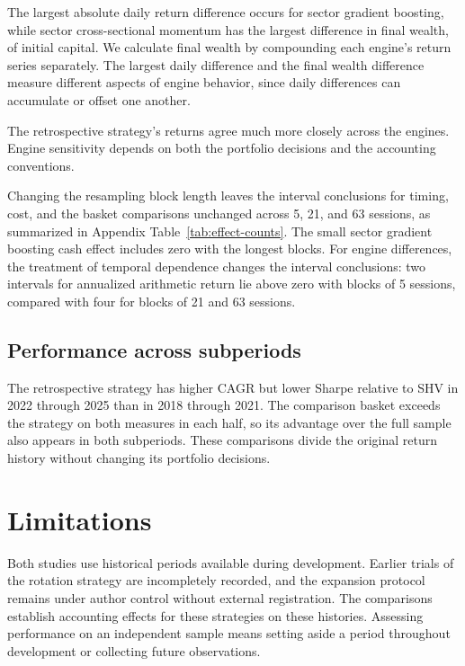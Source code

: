 \documentclass{article}
\begin{document}
The largest absolute daily return difference occurs for sector gradient boosting, while sector cross-sectional momentum has the largest difference in final wealth, \ExpansionEngineMaxWealthGap{} of initial capital. We calculate final wealth by compounding each engine's return series separately. The largest daily difference and the final wealth difference measure different aspects of engine behavior, since daily differences can accumulate or offset one another.

The retrospective strategy's returns agree much more closely across the engines. Engine sensitivity depends on both the portfolio decisions and the accounting conventions.

Changing the resampling block length leaves the interval conclusions for timing, cost, and the basket comparisons unchanged across 5, 21, and 63 sessions, as summarized in Appendix Table~\ref{tab:effect-counts}. The small sector gradient boosting cash effect includes zero with the longest blocks. For engine differences, the treatment of temporal dependence changes the interval conclusions: two intervals for annualized arithmetic return lie above zero with blocks of 5 sessions, compared with four for blocks of 21 and 63 sessions.

\subsection{Performance across subperiods}

The retrospective strategy has higher CAGR but lower Sharpe relative to SHV in 2022 through 2025 than in 2018 through 2021. The comparison basket exceeds the strategy on both measures in each half, so its advantage over the full sample also appears in both subperiods. These comparisons divide the original return history without changing its portfolio decisions.

\section{Limitations}
\label{sec:limitations}

Both studies use historical periods available during development. Earlier trials of the rotation strategy are incompletely recorded, and the expansion protocol remains under author control without external registration. The comparisons establish accounting effects for these strategies on these histories. Assessing performance on an independent sample means setting aside a period throughout development or collecting future observations.
\end{document}
